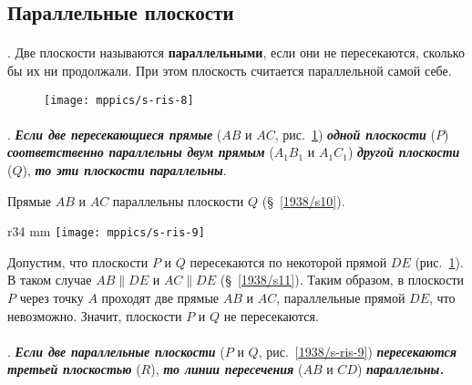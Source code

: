 \subsection*{Параллельные плоскости}

\paragraph{}\label{1938/s14}
.
Две плоскости называются \textbf{параллельными}, если они не пересекаются, сколько бы их ни продолжали.
При этом плоскость считается параллельной самой себе.

\begin{figure}[h!]
\centering
\texttt{[image: mppics/s-ris-8]}
\caption{}\label{1938/s-ris-8}
\end{figure}

\paragraph{}\label{1938/s15}
. \textbf{\emph{Если две пересекающиеся прямые}} ($AB$ и $AC$, рис.~\ref{1938/s-ris-8}) \textbf{\emph{одной плоскости}} ($P$) \textbf{\emph{соответственно параллельны двум прямым}} ($A_1B_1$ и $A_1C_1$) \textbf{\emph{другой плоскости}} ($Q$), \textbf{\emph{то эти плоскости параллельны}}.

Прямые $AB$ и $AC$ параллельны плоскости $Q$ (§~\ref{1938/s10}).

\begin{wrapfigure}[14]{r}{34 mm}
\centering
\texttt{[image: mppics/s-ris-9]}
\caption{}\label{1938/s-ris-9}
\end{wrapfigure}

Допустим, что плоскости $P$ и $Q$ пересекаются по некоторой прямой $DE$ (рис.~\ref{1938/s-ris-8}).
В таком случае $AB \parallel DE$ и $AC \parallel DE$ (§~\ref{1938/s11}).
Таким образом, в плоскости $P$ через точку $A$ проходят две прямые $AB$ и $AC$, параллельные прямой $DE$, что невозможно.
Значит, плоскости $P$ и $Q$ не пересекаются.

\paragraph{}\label{1938/s16}
\mbox{.} \textbf{\emph{Если две параллельные плоскости}} ($P$ и $Q$, рис.~\ref{1938/s-ris-9}) \textbf{\emph{пересекаются третьей плоскостью}} ($R$), \textbf{\emph{то линии пересечения}} ($AB$ и $CD$) \textbf{\emph{параллельны.}}

